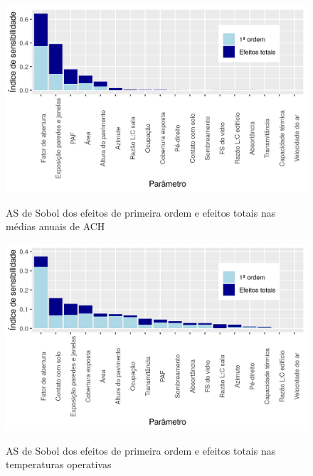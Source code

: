 \documentclass[brazil,hardcopy,openany,a4paper]{ufscthesis}
\begin{document}
	\begin{figure}[H]
		\centering
		\caption{AS de Sobol dos efeitos de primeira ordem e efeitos totais nas médias anuais de ACH}
		\includegraphics[width=1\linewidth]{img/as_ach.png}
		\label{fig:as_ach}
	\end{figure}
	
	\begin{figure}[H]
		\centering
		\caption{AS de Sobol dos efeitos de primeira ordem e efeitos totais nas temperaturas operativas}
		\includegraphics[width=1\linewidth]{img/as_temp.png}
		\label{fig:as_temp}
	\end{figure}
	
\end{document}
